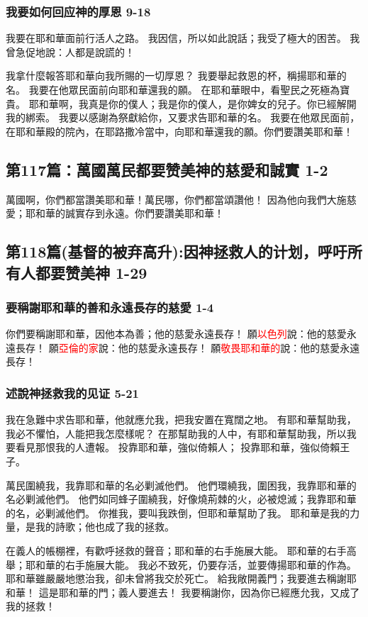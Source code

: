\subsubsection{我要如何回应神的厚恩 9-18}
我要在耶和華面前行活人之路。
我因信，所以如此說話；我受了極大的困苦。
我曾急促地說：人都是說謊的！

我拿什麼報答耶和華向我所賜的一切厚恩？
我要舉起救恩的杯，稱揚耶和華的名。
我要在他眾民面前向耶和華還我的願。
在耶和華眼中，看聖民之死極為寶貴。
耶和華啊，我真是你的僕人；我是你的僕人，是你婢女的兒子。你已經解開我的綁索。
我要以感謝為祭獻給你，又要求告耶和華的名。
我要在他眾民面前，在耶和華殿的院內，在耶路撒冷當中，向耶和華還我的願。你們要讚美耶和華！



\subsection{第117篇：萬國萬民都要赞美神的慈愛和誠實 1-2}
萬國啊，你們都當讚美耶和華！萬民哪，你們都當頌讚他！
因為他向我們大施慈愛；耶和華的誠實存到永遠。你們要讚美耶和華！

\subsection{第118篇(基督的被弃高升):因神拯救人的计划，呼吁所有人都要赞美神 1-29}
\subsubsection{要稱謝耶和華的善和永遠長存的慈愛 1-4}
你們要稱謝耶和華，因他本為善；他的慈愛永遠長存！
願\textcolor{red}{以色列}說：他的慈愛永遠長存！
願\textcolor{red}{亞倫的家}說：他的慈愛永遠長存！
願\textcolor{red}{敬畏耶和華的}說：他的慈愛永遠長存！

\subsubsection{述說神拯救我的见证 5-21}
我在急難中求告耶和華，他就應允我，把我安置在寬闊之地。
有耶和華幫助我，我必不懼怕，人能把我怎麼樣呢？
在那幫助我的人中，有耶和華幫助我，所以我要看見那恨我的人遭報。
投靠耶和華，強似倚賴人；
投靠耶和華，強似倚賴王子。

萬民圍繞我，我靠耶和華的名必剿滅他們。
他們環繞我，圍困我，我靠耶和華的名必剿滅他們。
他們如同蜂子圍繞我，好像燒荊棘的火，必被熄滅；我靠耶和華的名，必剿滅他們。
你推我，要叫我跌倒，但耶和華幫助了我。
耶和華是我的力量，是我的詩歌；他也成了我的拯救。

在義人的帳棚裡，有歡呼拯救的聲音；耶和華的右手施展大能。
耶和華的右手高舉；耶和華的右手施展大能。
我必不致死，仍要存活，並要傳揚耶和華的作為。
耶和華雖嚴嚴地懲治我，卻未曾將我交於死亡。
給我敞開義門；我要進去稱謝耶和華！
這是耶和華的門；義人要進去！
我要稱謝你，因為你已經應允我，又成了我的拯救！

